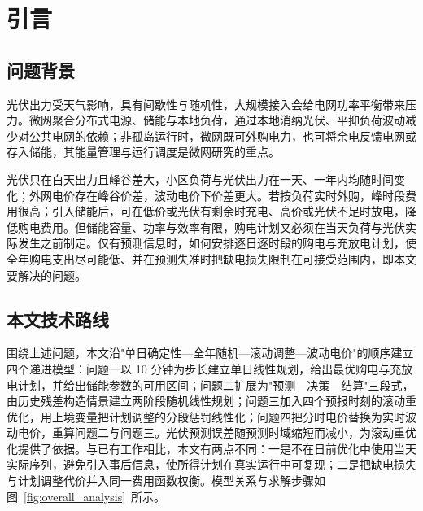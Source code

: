 
\section{引言}
\subsection{问题背景}

光伏出力受天气影响，具有间歇性与随机性，大规模接入会给电网功率平衡带来压力。微网聚合分布式电源、储能与本地负荷\cite{luzongxiang2007}，通过本地消纳光伏、平抑负荷波动减少对公共电网的依赖；非孤岛运行时，微网既可外购电力，也可将余电反馈电网或存入储能\cite{yangxinfa2014,wuxiong2014}，其能量管理与运行调度是微网研究的重点。

光伏只在白天出力且峰谷差大，小区负荷与光伏出力在一天、一年内均随时间变化；外网电价存在峰谷价差，波动电价下价差更大\cite{zhangqin2008}。若按负荷实时外购，峰时段费用很高；引入储能后，可在低价或光伏有剩余时充电、高价或光伏不足时放电，降低购电费用\cite{zhoulin2011,sangbingyu2014}。但储能容量、功率与效率有限，购电计划又必须在当天负荷与光伏实际发生之前制定。仅有预测信息时，如何安排逐日逐时段的购电与充放电计划，使全年购电支出尽可能低、并在预测失准时把缺电损失限制在可接受范围内，即本文要解决的问题。

\subsection{本文技术路线}

围绕上述问题，本文沿"单日确定性—全年随机—滚动调整—波动电价"的顺序建立四个递进模型：问题一以 10 分钟为步长建立单日线性规划，给出最优购电与充放电计划，并给出储能参数的可用区间\cite{dantzig1963,yunchouxue2021}；问题二扩展为"预测—决策—结算"三段式，由历史残差构造情景建立两阶段随机线性规划\cite{birge2011,si2011}；问题三加入四个预报时刻的滚动重优化\cite{parisio2014}，用上境变量把计划调整的分段惩罚线性化；问题四把分时电价替换为实时波动电价，重算问题二与问题三。光伏预测误差随预测时域缩短而减小\cite{liuweiliang2018}，为滚动重优化提供了依据。与已有工作相比，本文有两点不同：一是不在日前优化中使用当天实际序列，避免引入事后信息，使所得计划在真实运行中可复现；二是把缺电损失与计划调整代价并入同一费用函数权衡。模型关系与求解步骤如图~\ref{fig:overall_analysis}~所示。
